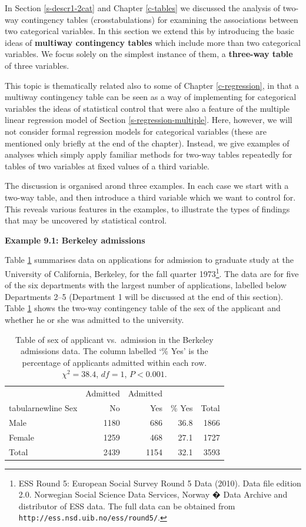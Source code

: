 \documentclass[11pt,a4paper,openany]{book}
\let\rmarkdownfootnote\footnote%
\def\footnote{\protect\rmarkdownfootnote}
\begin{document}
In Section \ref{s-descr1-2cat} and Chapter \ref{c-tables} we discussed
the analysis of two-way contingency tables (crosstabulations) for
examining the associations between two categorical variables. In this
section we extend this by introducing the basic ideas of
\textbf{multiway contingency tables} which include more than two
categorical variables. We focus solely on the simplest instance of them,
a \textbf{three-way table} of three variables.

This topic is thematically related also to some of Chapter
\ref{c-regression}, in that a multiway contingency table can be seen as
a way of implementing for categorical variables the ideas of statistical
control that were also a feature of the multiple linear regression model
of Section \ref{s-regression-multiple}. Here, however, we will not
consider formal regression models for categorical variables (these are
mentioned only briefly at the end of the chapter). Instead, we give
examples of analyses which simply apply familiar methods for two-way
tables repeatedly for tables of two variables at fixed values of a third
variable.

The discussion is organised arond three examples. In each case we start
with a two-way table, and then introduce a third variable which we want
to control for. This reveals various features in the examples, to
illustrate the types of findings that may be uncovered by statistical
control.

\textbf{Example 9.1: Berkeley admissions}

Table \ref{tab:t-berkeley1} summarises data on applications for
admission to graduate study at the University of California, Berkeley,
for the fall quarter 1973\footnote{ESS Round 5: European Social Survey
  Round 5 Data (2010). Data file edition 2.0. Norwegian Social Science
  Data Services, Norway � Data Archive and distributor of ESS data. The
  full data can be obtained from
  \texttt{http://ess.nsd.uib.no/ess/round5/}.}. The data are for five of
the six departments with the largest number of applications, labelled
below Departments 2--5 (Department 1 will be discussed at the end of
this section). Table \ref{tab:t-berkeley1} shows the two-way contingency
table of the sex of the applicant and whether he or she was admitted to
the university.

\begin{longtable}[]{@{}lrrrr@{}}
\caption{\label{tab:t-berkeley1} Table of sex of applicant vs.~admission in
the Berkeley admissions data. The column labelled `\% Yes' is the
percentage of applicants admitted within each row. \(\chi^{2}=38.4\),
\(df=1\), \(P<0.001\).}\tabularnewline
\toprule
\ & Admitted & Admitted & \ & \\tabularnewline
Sex & No & Yes & \% Yes & Total\tabularnewline
Male & 1180 & 686 & 36.8 & 1866\tabularnewline
Female & 1259 & 468 & 27.1 & 1727\tabularnewline
Total & 2439 & 1154 & 32.1 & 3593\tabularnewline
\bottomrule
\end{longtable}
\end{document}

